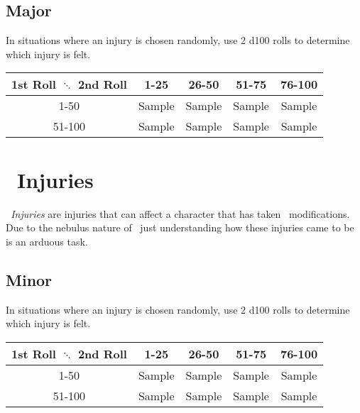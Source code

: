 \subsection{Major}
In situations where an injury is chosen randomly, use 2 d100 rolls to determine which injury is felt.
\begin{center}
\begin{tabular}{c | c | c | c | c}
1st Roll $\ddots$ 2nd Roll & 1-25 & 26-50 & 51-75 & 76-100 \\
\hline
1-50 & Sample & Sample & Sample & Sample\\
\hline
51-100 & Sample & Sample & Sample & Sample\\
\end{tabular}
\end{center}
\begin{multicols}{2}
\end{multicols}

\section{\magit\ Injuries}\label{sec:magi_injuries}
\emph{\magit\ Injuries} are injuries that can affect a character that has taken \magit\ modifications. Due to the nebulus nature of \magit\ just understanding how these injuries came to be is an arduous task.

\subsection{Minor}
In situations where an injury is chosen randomly, use 2 d100 rolls to determine which injury is felt.
\begin{center}
\begin{tabular}{c | c | c | c | c}
1st Roll $\ddots$ 2nd Roll & 1-25 & 26-50 & 51-75 & 76-100 \\
\hline
1-50 & Sample & Sample & Sample & Sample\\
\hline
51-100 & Sample & Sample & Sample & Sample\\
\end{tabular}
\end{center}
\begin{multicols}{2}
\end{multicols}

